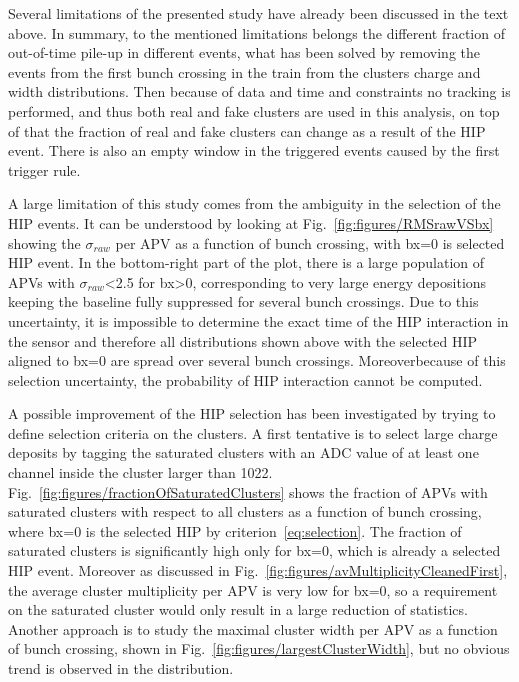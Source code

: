 Several limitations of the presented study have already been discussed in the text above. In summary, to the mentioned limitations belongs the different fraction of out-of-time pile-up in different events, what has been solved by removing the events from the first bunch crossing in the train from the clusters charge and width distributions. Then because of data and time and constraints no tracking is performed, and thus both real and fake clusters are used in this analysis, on top of that the fraction of real and fake clusters can change as a result of the HIP event. There is also an empty window in the triggered events caused by the first trigger rule.


A large limitation of this study comes from the ambiguity in the selection of the HIP events. It can be understood by looking at Fig.~\ref{fig:figures/RMSrawVSbx} showing the $\sigma_{raw}$ per APV as a function of bunch crossing, with bx=0 is selected HIP event. In the bottom-right part of the plot, there is a large population of APVs with $\sigma_{raw}$<2.5 for bx>0, corresponding to very large energy depositions keeping the baseline fully suppressed for several bunch crossings. Due to this uncertainty, it is impossible to determine the exact time of the HIP interaction in the sensor and therefore all distributions shown above with the selected HIP aligned to bx=0 are spread over several bunch crossings. Moreoverbecause of this selection uncertainty, the probability of HIP interaction cannot be computed. 


A possible improvement of the HIP selection has been investigated by trying to define selection criteria on the clusters. A first tentative is to select large charge deposits by tagging the saturated clusters with an ADC value of at least one channel inside the cluster larger than 1022. Fig.~\ref{fig:figures/fractionOfSaturatedClusters} shows the fraction of APVs with saturated clusters with respect to all clusters as a function of bunch crossing, where bx=0 is the selected HIP by criterion~\ref{eq:selection}. The fraction of saturated clusters is significantly high only for bx=0, which is already a selected HIP event. Moreover as discussed in Fig.~\ref{fig:figures/avMultiplicityCleanedFirst}, the average cluster multiplicity per APV is very low for bx=0, so a requirement on the saturated cluster would only result in a large reduction of statistics. Another approach is to study the maximal cluster width per APV as a function of bunch crossing, shown in Fig.~\ref{fig:figures/largestClusterWidth}, but no obvious trend is observed in the distribution. 


